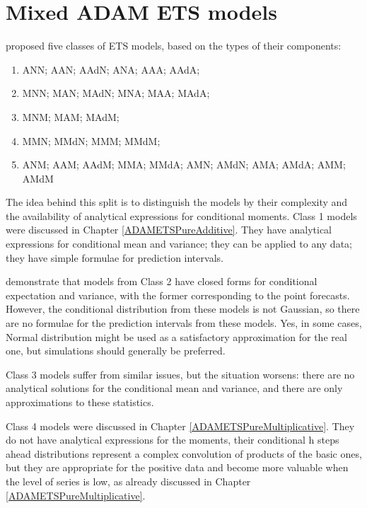 \documentclass[]{book}
\providecommand{\tightlist}{%
  \setlength{\itemsep}{0pt}\setlength{\parskip}{0pt}}
\theoremstyle{definition}
\theoremstyle{definition}
\theoremstyle{definition}
\theoremstyle{definition}
\theoremstyle{remark}
\begin{document}
\hypertarget{ADAMETSMixedModels}{%
\section{Mixed ADAM ETS models}\label{ADAMETSMixedModels}}

\citet{Hyndman2008b} proposed five classes of ETS models, based on the types of their components:

\begin{enumerate}
\def\labelenumi{\arabic{enumi}.}
\tightlist
\item
  ANN; AAN; AAdN; ANA; AAA; AAdA;
\item
  MNN; MAN; MAdN; MNA; MAA; MAdA;
\item
  MNM; MAM; MAdM;
\item
  MMN; MMdN; MMM; MMdM;
\item
  ANM; AAM; AAdM; MMA; MMdA; AMN; AMdN; AMA; AMdA; AMM; AMdM
\end{enumerate}

The idea behind this split is to distinguish the models by their complexity and the availability of analytical expressions for conditional moments. Class 1 models were discussed in Chapter \ref{ADAMETSPureAdditive}. They have analytical expressions for conditional mean and variance; they can be applied to any data; they have simple formulae for prediction intervals.

\citet{Hyndman2008b} demonstrate that models from Class 2 have closed forms for conditional expectation and variance, with the former corresponding to the point forecasts. However, the conditional distribution from these models is not Gaussian, so there are no formulae for the prediction intervals from these models. Yes, in some cases, Normal distribution might be used as a satisfactory approximation for the real one, but simulations should generally be preferred.

Class 3 models suffer from similar issues, but the situation worsens: there are no analytical solutions for the conditional mean and variance, and there are only approximations to these statistics.

Class 4 models were discussed in Chapter \ref{ADAMETSPureMultiplicative}. They do not have analytical expressions for the moments, their conditional h steps ahead distributions represent a complex convolution of products of the basic ones, but they are appropriate for the positive data and become more valuable when the level of series is low, as already discussed in Chapter \ref{ADAMETSPureMultiplicative}.
\end{document}
